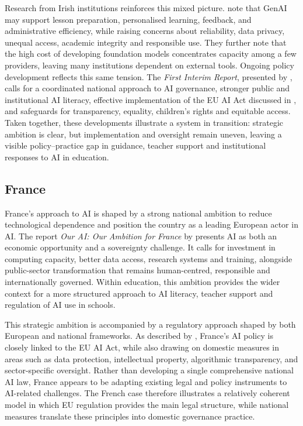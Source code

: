 Research from Irish institutions reinforces this mixed picture. \cite{byrne2024genai}
note that GenAI may support lesson preparation, personalised learning, feedback, and
administrative efficiency, while raising concerns about reliability, data privacy,
unequal access, academic integrity and responsible use. They further note that the
high cost of developing foundation models concentrates capacity among a few
providers, leaving many institutions dependent on external tools. Ongoing policy
development reflects this same tension. The \textit{First Interim Report}, presented
by \cite{jointcommittee2025interim}, calls for a coordinated national approach to AI
governance, stronger public and institutional AI literacy, effective implementation
of the EU AI Act discussed in \cite{eu2024aiact}, and safeguards for transparency,
equality, children's rights and equitable access. Taken together, these developments
illustrate a system in transition: strategic ambition is clear, but implementation
and oversight remain uneven, leaving a visible policy--practice gap in guidance,
teacher support and institutional responses to AI in education.


\subsection{France}

France's approach to AI is shaped by a strong national ambition to reduce
technological dependence and position the country as a leading European actor in AI.
The report \textit{Our AI: Our Ambition for France} by
\cite{aicommission2024ambition} presents AI as both an economic opportunity and a
sovereignty challenge. It calls for investment in computing capacity, better data
access, research systems and training, alongside public-sector transformation that
remains human-centred, responsible and internationally governed. Within education,
this ambition provides the wider context for a more structured approach to AI
literacy, teacher support and regulation of AI use in schools.

This strategic ambition is accompanied by a regulatory approach shaped by both
European and national frameworks. As described by \cite{france2025aipolicy}, France's
AI policy is closely linked to the EU AI Act, while also drawing on domestic measures
in areas such as data protection, intellectual property, algorithmic transparency,
and sector-specific oversight. Rather than developing a single comprehensive national
AI law, France appears to be adapting existing legal and policy instruments to
AI-related challenges. The French case therefore illustrates a relatively coherent
model in which EU regulation provides the main legal structure, while national
measures translate these principles into domestic governance practice.


